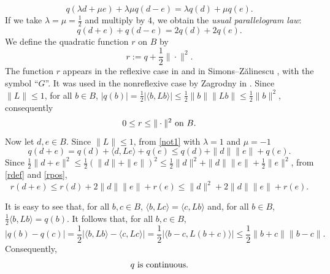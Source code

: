\documentclass[letterpaper]{article}
\theoremstyle{plain}
\theoremstyle{definition}
\numberwithin{equation}{section}
\newcommand{\bra}[2]{\langle#1,#2\rangle}
\newcommand{\half}{{\textstyle\frac{1}{2}}}
\newcommand{\on}{\hbox{on}}
\newcommand{\Sec}{Section~\ref}
\begin{document}
\begin{equation}\label{not2}
q(\lambda d + \mu e) + \lambda\mu q(d - e) = \lambda q(d) + \mu q(e).
\end{equation}
%
If we take $\lambda =\mu = \half$ and multiply by 4, we obtain the {\em usual parallelogram law}:
\begin{equation}\label{not2U}
q(d + e) + q(d - e) = 2q(d) + 2q(e).
\end{equation}
%
We define the quadratic function $r$ on $B$ by
\begin{equation}\label{rdef}
r := q + \half\|\cdot\|^2.
\end{equation}
%
The function $r$ appears in the reflexive case in \cite[Theorem~10.3,\ p.\ 36]{MANDM}  and  in Simons--Z\u{a}linescu \cite{SZNZ}, with the symbol ``$G$''.   It was used in the nonreflexive case by Zagrodny in \cite{ZAGRODNY}.   Since $\|L\| \le 1$, for all $b \in B$, $|q(b)| = \half|\bra{b}{Lb}| \le \half\|b\|\|Lb\| \le \half\|b\|^2$, consequently
\begin{equation}\label{rpos}
0 \le  r \le \|\cdot\|^2\ \on\ B.
\end{equation}
%
Now let $d,e \in B$.   Since $\|L\| \le 1$, from \eqref{not1} with $\lambda = 1$ and $\mu = -1$  
\begin{equation}\label{not8}
q(d + e) = q(d) + \bra{d}{Le} + q(e) \le q(d) + \|d\|\|e\| + q(e).
\end{equation}
%
Since $\half\|d + e\|^2 \le \half(\|d\| + \|e\|)^2 \le \half\|d\|^2 + \|d\|\|e\| + \half\|e\|^2$, from \eqref{rdef} and \eqref{rpos}, 
\begin{equation}\label{not8R}
r(d + e) \le r(d) + 2\|d\|\|e\| + r(e) \le \|d\|^2 + 2\|d\|\|e\| + r(e).
\end{equation}
%
\par
It is easy to see that, for all $b,c \in B$, $\bra{b}{Lc} = \bra{c}{Lb}$ and, for all $b \in B$, $\half\bra{b}{Lb} = q(b)$.   It follows that, for all $b,c \in B$,
%
\begin{equation*}
|q(b) - q(c)| = \half|\bra{b}{Lb} - \bra{c}{Lc}| = \half|\bra{b - c}{L(b + c)}| \le \half\|b + c\|\|b - c\|.
\end{equation*}
%
Consequently,
\begin{equation}\label{qcont}
q\hbox{ is continuous}.
\end{equation}
\end{document}

